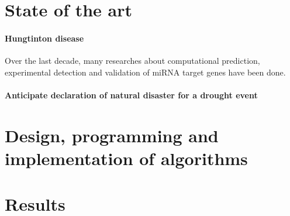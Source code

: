 \section{State of the art}

\paragraph{Hungtinton disease}

Over the last decade, many researches about computational prediction, experimental detection and validation of miRNA target genes have been done.





  
\paragraph{Anticipate declaration of natural disaster for a drought event}


\section{Design, programming and implementation of algorithms}
\section{Results}
